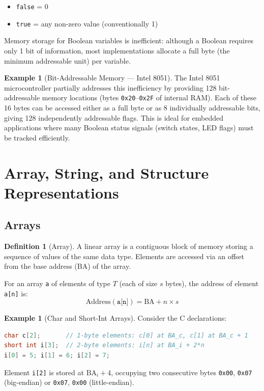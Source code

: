 \documentclass[11pt, a4paper, notitlepage]{report}
\theoremstyle{definition}
\newtheorem{definition}[theorem]{Definition}
\theoremstyle{remark}
\theoremstyle{definition}
\newtheorem{example}[theorem]{Example}
\begin{document}
\begin{itemize}
  \item \texttt{false} = 0
  \item \texttt{true} = any non-zero value (conventionally 1)
\end{itemize}

Memory storage for Boolean variables is inefficient: although a Boolean requires only 1 bit of information, most implementations allocate a full byte (the minimum addressable unit) per variable.

\begin{example}[Bit-Addressable Memory --- Intel 8051]
The Intel 8051 microcontroller partially addresses this inefficiency by providing 128 bit-addressable memory locations (bytes \texttt{0x20}--\texttt{0x2F} of internal RAM). Each of these 16 bytes can be accessed either as a full byte or as 8 individually addressable bits, giving 128 independently addressable flags. This is ideal for embedded applications where many Boolean status signals (switch states, LED flags) must be tracked efficiently.
\end{example}

\section{Array, String, and Structure Representations}

\subsection{Arrays}

\begin{definition}[Array]
\label{def:array}
A linear array is a contiguous block of memory storing a sequence of values of the same data type. Elements are accessed via an offset from the base address (BA) of the array.
\end{definition}

For an array \texttt{a} of elements of type $T$ (each of size $s$ bytes), the address of element \texttt{a[n]} is:
\[
  \text{Address}(\texttt{a[n]}) = \text{BA} + n \times s
\]

\begin{example}[Char and Short-Int Arrays]
Consider the C declarations:
\begin{lstlisting}[language=C]
char c[2];       // 1-byte elements: c[0] at BA_c, c[1] at BA_c + 1
short int i[3];  // 2-byte elements: i[n] at BA_i + 2*n
i[0] = 5; i[1] = 6; i[2] = 7;
\end{lstlisting}
Element \texttt{i[2]} is stored at $\text{BA}_i + 4$, occupying two consecutive bytes \texttt{0x00}, \texttt{0x07} (big-endian) or \texttt{0x07}, \texttt{0x00} (little-endian).
\end{example}
\end{document}
